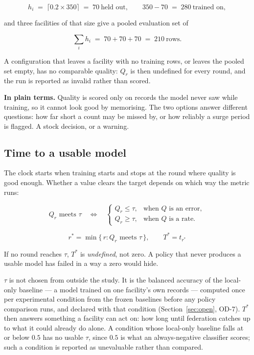 \[
h_i \;=\; \lceil 0.2 \times 350 \rceil \;=\; 70\ \text{held out},
\qquad
350 - 70 \;=\; 280\ \text{trained on},
\]

\noindent
and three facilities of that size give a pooled evaluation set of

\[
\sum_i h_i \;=\; 70 + 70 + 70 \;=\; 210\ \text{rows}.
\]

\noindent
A configuration
that leaves a facility with no training rows, or leaves the pooled set empty, has no comparable
quality: $Q_r$ is then undefined for every round, and the run is reported as invalid rather than
scored.

\noindent\textbf{In plain terms.} Quality is scored only on records the model never saw while
training, so it cannot look good by memorising. The two options answer different questions: how
far short a count may be missed by, or how reliably a surge period is flagged. A stock decision,
or a warning.

\subsection{Time to a usable model}

The clock starts when training starts and stops at the round where quality is good enough. Whether
a value clears the target depends on which way the metric runs:

\[
Q_r \text{ meets } \tau \quad\Longleftrightarrow\quad
\begin{cases}
Q_r \le \tau, & \text{when } Q \text{ is an error},\\[2pt]
Q_r \ge \tau, & \text{when } Q \text{ is a rate}.
\end{cases}
\]

\begin{equation}
r^{*} = \min\{\, r : Q_r \text{ meets } \tau \,\},
\qquad T^{*} = t_{r^{*}}
\label{eq:tstar}
\end{equation}

\noindent
If no round reaches $\tau$, $T^{*}$ is \emph{undefined}, not zero. A policy that never produces
a usable model has failed in a way a zero would hide.

\noindent
$\tau$ is not chosen from outside the study. It is the balanced accuracy of the local-only baseline
--- a model trained on one facility's own records --- computed once per experimental condition from
the frozen baselines before any policy comparison runs, and declared with that condition
(Section~\ref{sec:open}, OD-7). $T^{*}$ then answers something a facility can act on: how long
until federation catches up to what it could already do alone. A condition whose local-only
baseline falls at or below $0.5$ has no usable $\tau$, since $0.5$ is what an always-negative
classifier scores; such a condition is reported as unevaluable rather than compared.

